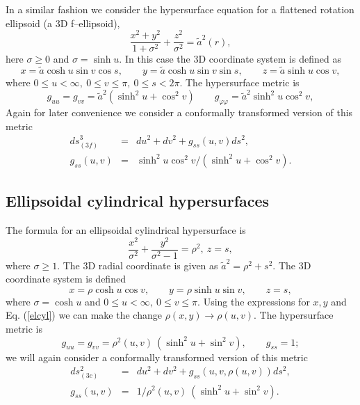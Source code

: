 \documentclass[a4paper,preprint,prabib,aps]{revtex4}
\begin{document}
In a similar fashion we consider the hypersurface equation for a flattened
rotation ellipsoid (a 3D f--ellipsoid),
\begin{equation}
\frac{x^{2}+y^{2}}{1+\sigma ^{2}}+\frac{z^{2}}{\sigma ^{2}}=\widetilde{a}%
^{2}(r),  \label{relhor1}
\end{equation}
here $\sigma \geq 0$ and $\sigma =\sinh u.$ In this case the 3D coordinate
system is defined as
\begin{equation}
x=\widetilde{a}\cosh u\sin v\cos s,\qquad y=\widetilde{a}\cosh u\sin v\sin
s,\qquad z=\widetilde{a}\sinh u\cos v,
\end{equation}
where $0\leq u<\infty ,\ 0\leq v\leq \pi ,\ 0\leq s<2\pi .$ The hypersurface
metric is
\begin{equation}
g_{uu}=g_{vv}=\widetilde{a}^{2}\left( \sinh ^{2}u+\cos ^{2}v\right) \qquad
g_{\varphi \varphi }=\widetilde{a}^{2}\sinh ^{2}u\cos ^{2}v,  \nonumber
\end{equation}
Again for later convenience we consider a conformally transformed version of
this metric
\begin{eqnarray}
ds_{(3f)}^{3} &=&du^{2}+dv^{2}+g_{ss}(u,v)ds^{2},  \label{hsuf1b} \\
g_{ss}(u,v) &=&\sinh ^{2}u\cos ^{2}v/(\sinh ^{2}u+\cos ^{2}v).  \nonumber
\end{eqnarray}

\subsection{Ellipsoidal cylindrical hypersurfaces}

The formula for an ellipsoidal cylindrical hypersurface is
\begin{equation}
\frac{x^{2}}{\sigma ^{2}}+\frac{y^{2}}{\sigma ^{2}-1}=\rho ^{2},\ z=s,
\label{elcyl}
\end{equation}
where $\sigma \geq 1.$ The 3D radial coordinate is given as $\widetilde{a}%
^{2}=\rho ^{2}+s^{2}.$ The 3D coordinate system is defined
\[
x=\rho \cosh u\cos v,\qquad y=\rho \sinh u\sin v,\qquad z=s,
\]
where $\sigma =\cosh u$ and $0\leq u<\infty ,\ 0\leq v\leq \pi $. Using the
expressions for $x,y$ and Eq. (\ref{elcyl}) we can make the change $\rho
(x,y)\rightarrow \rho (u,v)$. The hypersurface metric is
\[
g_{uu}=g_{vv}=\rho ^{2}(u,v)\ \left( \sinh ^{2}u+\sin ^{2}v\right) ,\qquad
g_{ss}=1;
\]
we will again consider a conformally transformed version of this metric
\begin{eqnarray}
ds_{(3c)}^{2} &=&du^{2}+dv^{2}+g_{ss}(u,v,\rho (u,v))ds^{2},  \label{cylin1}
\\
g_{ss}(u,v) &=&1/\rho ^{2}(u,v)\ (\sinh ^{2}u+\sin ^{2}v).  \nonumber
\end{eqnarray}
\end{document}
